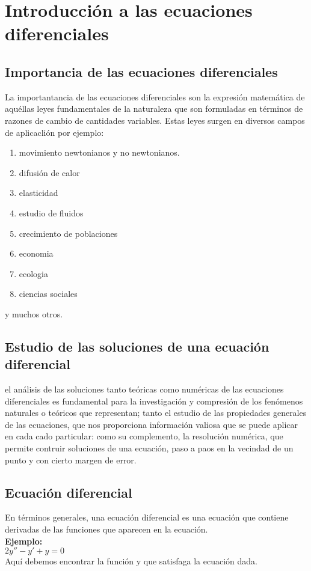 \documentclass{article}
\begin{document}
    \section{Introducción a las ecuaciones diferenciales}

    \subsection{Importancia de las ecuaciones diferenciales}
    La importantancia de las ecuaciones diferenciales son la expresión 
    matemática de aquéllas leyes fundamentales 
    de la naturaleza que son formuladas en términos de razones de cambio
    de cantidades variables.
    Estas leyes surgen en diversos campos de aplicaclión por ejemplo:

    \begin{enumerate}
        \item movimiento newtonianos y no newtonianos.
        \item difusión de calor
        \item elasticidad
        \item estudio de fluidos
        \item crecimiento de poblaciones 
        \item economia
        \item ecologia
        \item ciencias sociales 
    \end{enumerate}

    y muchos otros.
    \subsection{Estudio de las soluciones de una ecuación diferencial}

    el análisis de las soluciones tanto teóricas como numéricas de las ecuaciones
    diferenciales es fundamental para la investigación y compresión de los fenómenos naturales
    o teóricos que representan; tanto el estudio de las propiedades generales de las ecuaciones, que nos 
    proporciona información valiosa que se puede aplicar en cada cado particular: como su complemento, la resolución numérica,
    que permite contruir soluciones de una ecuación, paso a paos en la vecindad de un punto y con cierto margen de error.
    
    \subsection{Ecuación diferencial}
    En términos generales, una ecuación diferencial es una ecuación que 
    contiene derivadas de las funciones que aparecen en la ecuación.
    \\
    \textbf{Ejemplo:}
    \\
    $2y''-y'+y=0$
    \\ 
    Aquí debemos encontrar la función y que satisfaga la ecuación dada.
    
\end{document}
